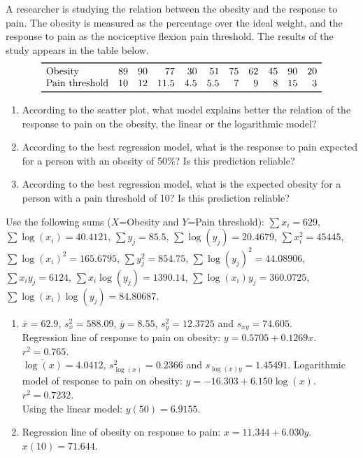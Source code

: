 {A researcher is studying the relation between the obesity and the response to pain.
The obesity is measured as the percentage over the ideal weight, and the response to pain as the nociceptive flexion pain threshold.
The results of the study appears in the table below.
\[
\begin{array}{lrrrrrrrrrr}
\toprule
\mbox{Obesity} & 89 & 90 & 77 & 30 & 51 & 75 & 62 & 45 & 90 & 20\\
\mbox{Pain threshold} & 10 & 12 & 11.5 & 4.5 & 5.5 & 7 & 9 & 8 & 15 & 3\\
\bottomrule
\end{array}
\]
\begin{enumerate}
\item According to the scatter plot, what model explains better the relation of the response to pain on the obesity, the linear or the logarithmic model?
\item According to the best regression model, what is the response to pain expected for a person with an obesity of 50\%?
Is this prediction reliable?
\item According to the best regression model, what is the expected obesity for a person with a pain threshold of
10? Is this prediction reliable?
\end{enumerate}
Use the following sums ($X$=Obesity and $Y$=Pain threshold): $\sum x_i=629$, $\sum \log(x_i)=40.4121$, $\sum y_j=85.5$,
$\sum \log(y_j)=20.4679$, $\sum x_i^2=45445$, $\sum \log(x_i)^2=165.6795$, $\sum y_j^2=854.75$, $\sum\log(y_j)^2=44.08906$, $\sum x_iy_j=6124$, $\sum x_i\log(y_j)=1390.14$, $\sum \log(x_i)y_j=360.0725$, $\sum\log(x_i)\log(y_j)=84.80687$.
}
{
\begin{enumerate}[start=2]
\item $\bar{x}=62.9$, $s_x^2=588.09$, $\bar{y}=8.55$, $s_y^2=12.3725$ and $s_{xy}=74.605$.\\
Regression line of response to pain on obesity: $y=0.5705+0.1269x$. $r^2=0.765$.\\
$\overline{\log(x)}=4.0412$, $s_{\log(x)}^2=0.2366$ and $s_{\log(x)y}=1.45491$.
Logarithmic model of response to pain on obesity: $y=-16.303+6.150\log(x)$.
$r^2=0.7232$.\\
Using the linear model: $y(50)=6.9155$.
\item Regression line of obesity on response to pain: $x=11.344+6.030y$.\\
$x(10)=71.644$.
\end{enumerate}
}
{
}


